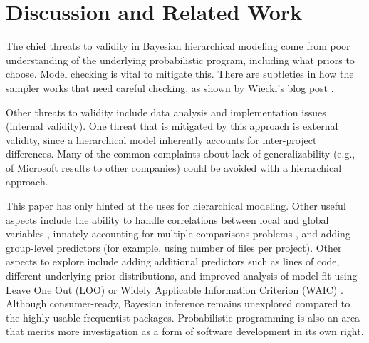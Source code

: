 \documentclass[sigconf,natbib=false]{acmart}
\begin{document}
% 
\section{Discussion and Related Work}
\label{related}
The chief threats to validity in Bayesian hierarchical modeling come from poor understanding of the underlying probabilistic program, including what priors to choose. Model checking is vital to mitigate this. There are subtleties in how the sampler works that need careful checking, as shown by Wiecki's blog post \cite{Wiecki17}. 

Other threats to validity include data analysis and implementation issues (internal validity). One threat that is mitigated by this approach is external validity, since a hierarchical model inherently accounts for inter-project differences. Many of the common complaints about lack of generalizability (e.g., of Microsoft results to other companies) could be avoided with a hierarchical approach.%

This paper has only hinted at the uses for hierarchical modeling. Other useful aspects include the ability to handle correlations between local and global variables \cite{mcilreath16}, innately accounting for multiple-comparisons problems \cite{Gelman:2012aa}, and adding group-level predictors (for example, using number of files per project). Other aspects to explore include adding additional predictors such as lines of code, different underlying prior distributions, and improved analysis of model fit using Leave One Out (LOO) or Widely Applicable Information Criterion (WAIC) \cite{vehtari15}. Although consumer-ready, Bayesian inference remains unexplored compared to the highly usable frequentist packages. Probabilistic programming is also an area that merits more investigation as a form of software development in its own right.
\end{document}
